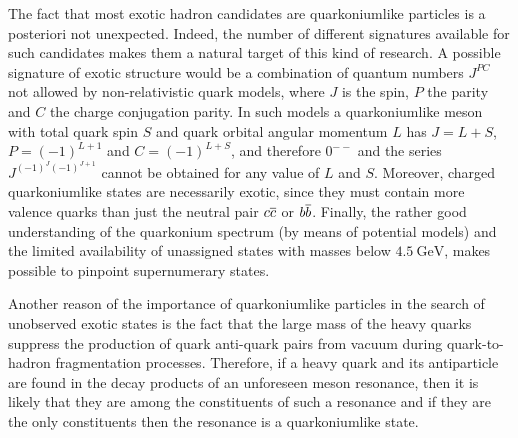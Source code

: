 The fact that most exotic hadron candidates are quarkoniumlike particles is a posteriori not unexpected. Indeed, the number of different signatures available for such candidates makes them a natural target of this kind of research. A possible signature of exotic structure would be a combination of quantum numbers $J^{P C}$ not allowed by non-relativistic quark models, where $J$ is the spin, $P$ the parity and $C$ the charge conjugation parity. In such models a quarkoniumlike meson with total quark spin $S$ and quark orbital angular momentum $L$ has $J = L + S$, $P = (-1)^{L + 1}$ and $C = (-1)^{L + S}$, and therefore $0^{- -}$ and the series $J^{ (-1)^J (-1)^{J+1}}$ cannot be obtained for any value of $L$ and $S$. Moreover, charged quarkoniumlike states are necessarily exotic, since they must contain more valence quarks than just the neutral pair $c \overline{c}$ or $b \overline{b}$. Finally, the rather good understanding of the quarkonium spectrum (by means of potential models) and the limited availability of unassigned states with masses below $4.5 \ \text{GeV}$, makes possible to pinpoint supernumerary states.

Another reason of the importance of quarkoniumlike particles in the search of unobserved exotic states is the fact that the large mass of the heavy quarks suppress the production of quark anti-quark pairs from vacuum during quark-to-hadron fragmentation processes. Therefore, if a heavy quark and its antiparticle are found in the decay products of an unforeseen meson resonance, then it is likely that they are among the constituents of such a resonance and if they are the only constituents then the resonance is a quarkoniumlike state.

